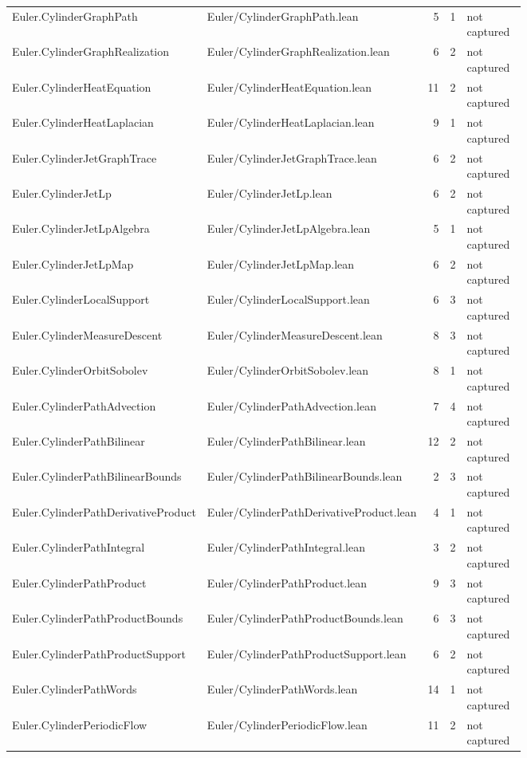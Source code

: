 \documentclass[10pt]{article}
\begin{document}
\begin{longtable}{p{0.28\linewidth}p{0.27\linewidth}r r p{0.20\linewidth}}
Euler.CylinderGraphPath & Euler/CylinderGraphPath.lean & 5 & 1 & not captured\\
Euler.CylinderGraphRealization & Euler/CylinderGraphRealization.lean & 6 & 2 & not captured\\
Euler.CylinderHeatEquation & Euler/CylinderHeatEquation.lean & 11 & 2 & not captured\\
Euler.CylinderHeatLaplacian & Euler/CylinderHeatLaplacian.lean & 9 & 1 & not captured\\
Euler.CylinderJetGraphTrace & Euler/CylinderJetGraphTrace.lean & 6 & 2 & not captured\\
Euler.CylinderJetLp & Euler/CylinderJetLp.lean & 6 & 2 & not captured\\
Euler.CylinderJetLpAlgebra & Euler/CylinderJetLpAlgebra.lean & 5 & 1 & not captured\\
Euler.CylinderJetLpMap & Euler/CylinderJetLpMap.lean & 6 & 2 & not captured\\
Euler.CylinderLocalSupport & Euler/CylinderLocalSupport.lean & 6 & 3 & not captured\\
Euler.CylinderMeasureDescent & Euler/CylinderMeasureDescent.lean & 8 & 3 & not captured\\
Euler.CylinderOrbitSobolev & Euler/CylinderOrbitSobolev.lean & 8 & 1 & not captured\\
Euler.CylinderPathAdvection & Euler/CylinderPathAdvection.lean & 7 & 4 & not captured\\
Euler.CylinderPathBilinear & Euler/CylinderPathBilinear.lean & 12 & 2 & not captured\\
Euler.CylinderPathBilinearBounds & Euler/CylinderPathBilinearBounds.lean & 2 & 3 & not captured\\
Euler.CylinderPathDerivativeProduct & Euler/CylinderPathDerivativeProduct.lean & 4 & 1 & not captured\\
Euler.CylinderPathIntegral & Euler/CylinderPathIntegral.lean & 3 & 2 & not captured\\
Euler.CylinderPathProduct & Euler/CylinderPathProduct.lean & 9 & 3 & not captured\\
Euler.CylinderPathProductBounds & Euler/CylinderPathProductBounds.lean & 6 & 3 & not captured\\
Euler.CylinderPathProductSupport & Euler/CylinderPathProductSupport.lean & 6 & 2 & not captured\\
Euler.CylinderPathWords & Euler/CylinderPathWords.lean & 14 & 1 & not captured\\
Euler.CylinderPeriodicFlow & Euler/CylinderPeriodicFlow.lean & 11 & 2 & not captured\\

\end{longtable}
\end{document}
